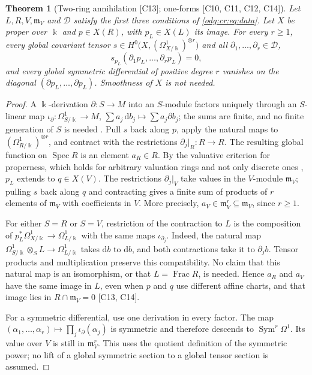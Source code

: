 \documentclass[11pt,oneside]{article}
\numberwithin{equation}{section}
\newtheorem{theorem}{Theorem}[section]
\theoremstyle{definition}
\theoremstyle{remark}
\newcommand{\Frac}{\operatorname{Frac}}
\newcommand{\src}[1]{\textup{\textsf{\small[#1]}}}
\newcommand{\Spec}{\operatorname{Spec}}
\newcommand{\Sym}{\operatorname{Sym}}
\newcommand{\dif}{\mathrm d}
\begin{document}
\begin{theorem}[Two-ring annihilation \src{C13}; one-forms \src{C10, C11, C12, C14}]\label{odg:cr:thm:annihilation}
Let $L,R,V,\mathfrak m_V$ and $\mathcal D$ satisfy the first three conditions of
\eqref{odg:cr:eq:data}. Let $X$ be proper over $\Bbbk$ and $p\in X(R)$, with
$p_L\in X(L)$ its image. For every $r\ge1$, every global covariant tensor
$s\in H^0\bigl(X,(\Omega^1_{X/\Bbbk})^{\otimes r}\bigr)$ and all
$\partial_1,\ldots,\partial_r\in\mathcal D$,
\begin{equation}\label{odg:cr:eq:annihilation}
 s_{p_L}(\partial_1p_L,\ldots,\partial_rp_L)=0 ,
\end{equation}
and every global symmetric differential of positive degree $r$ vanishes on
the diagonal $(\partial p_L,\ldots,\partial p_L)$. Smoothness of $X$ is not needed.
\end{theorem}
\begin{proof}
A $\Bbbk$-derivation $\partial:S\to M$ into an $S$-module factors uniquely through
an $S$-linear map $\iota_\partial:\Omega^1_{S/\Bbbk}\to M$,
$\sum a_j\,\dif b_j\mapsto\sum a_j\partial b_j$; the sums are finite, and no finite
generation of $S$ is needed \cite[Tag 00RM]{StacksDiff}. Pull $s$ back along
$p$, apply the natural maps to $(\Omega^1_{R/\Bbbk})^{\otimes r}$, and
contract with the restrictions $\partial_j|_R:R\to R$. The resulting global
function on $\Spec R$ is an element $a_R\in R$. By the valuative criterion
for properness, which holds for arbitrary valuation rings and not only discrete
ones \cite[Tag 0BX5]{StacksProper}, $p_L$ extends to $q\in X(V)$. The restrictions
$\partial_j|_V$ take values in the $V$-module $\mathfrak m_V$; pulling $s$ back along
$q$ and contracting gives a finite sum of products of $r$ elements of
$\mathfrak m_V$ with coefficients in $V$. More precisely,
$a_V\in\mathfrak m_V^r\subseteq\mathfrak m_V$, since $r\ge1$.

For either $S=R$ or $S=V$, restriction of the contraction to $L$ is the
composition of $p_L^*\Omega^1_{X/\Bbbk}\to\Omega^1_{L/\Bbbk}$ with the
same maps $\iota_{\partial_j}$. Indeed, the natural map
$\Omega^1_{S/\Bbbk}\otimes_S L\to\Omega^1_{L/\Bbbk}$ takes $\dif b$ to
$\dif b$, and both contractions take it to $\partial_j b$. Tensor products
and multiplication preserve this compatibility. No claim that this
natural map is an isomorphism, or that $L=\Frac R$, is needed. Hence
$a_R$ and $a_V$ have the same image in $L$, even when $p$ and $q$ use
different affine charts, and that image lies in $R\cap\mathfrak m_V=0$
\src{C13, C14}.

For a symmetric differential, use one derivation in every factor. The map
$(\alpha_1,\ldots,\alpha_r)\mapsto
\prod_j\iota_\partial(\alpha_j)$ is symmetric and therefore descends to
$\Sym^r\Omega^1$. Its value over $V$ is still in $\mathfrak m_V^r$.
This uses the quotient definition of the symmetric power; no lift of a
global symmetric section to a global tensor section is assumed.
\end{proof}
\end{document}
